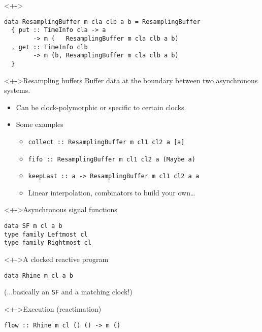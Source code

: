 \documentclass[handout]{enigtex-beamer-base}
\begin{document}
\begin{frame}[fragile]
\begin{block}<+->{}
\begin{verbatim}
data ResamplingBuffer m cla clb a b = ResamplingBuffer
  { put :: TimeInfo cla -> a
        -> m (   ResamplingBuffer m cla clb a b)
  , get :: TimeInfo clb
        -> m (b, ResamplingBuffer m cla clb a b)
  }
\end{verbatim}
\end{block}
\begin{block}<+->{Resampling buffers}
Buffer data at the boundary between two asynchronous systems.
\end{block}
	\begin{itemize}[<+->]
		\item Can be clock-polymorphic or specific to certain clocks.
		\item Some examples
		\begin{itemize}[<+->]
			\item \texttt{collect :: ResamplingBuffer m cl1 cl2 a [a]}
			\item \texttt{fifo :: ResamplingBuffer m cl1 cl2 a (Maybe a)}
			\item \texttt{keepLast :: a -> ResamplingBuffer m cl1 cl2 a a}
			\item Linear interpolation, combinators to build your own\dots
		\end{itemize}
	\end{itemize}
\end{frame}

\begin{frame}[fragile]
\begin{block}<+->{Asynchronous signal functions}
\begin{verbatim}
data SF m cl a b
type family Leftmost cl
type family Rightmost cl
\end{verbatim}
\end{block}
\begin{block}<+->{A clocked reactive program}
\begin{verbatim}
data Rhine m cl a b
\end{verbatim}
(...basically an \texttt{SF} and a matching clock!)
\end{block}
\begin{block}<+->{Execution (reactimation)}
\begin{verbatim}
flow :: Rhine m cl () () -> m ()
\end{verbatim}
\end{block}
\end{frame}
\end{document}
